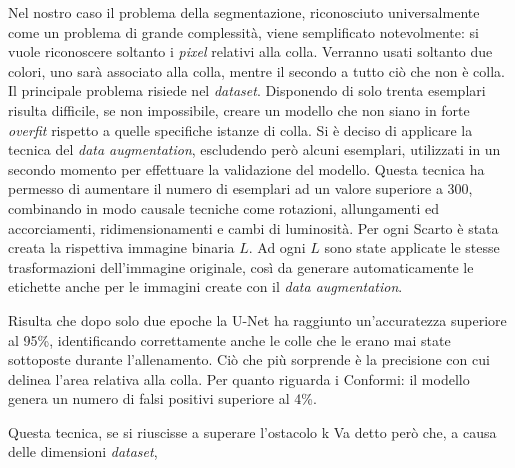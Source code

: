 Nel nostro caso il problema della segmentazione, riconosciuto universalmente come un problema di grande complessità, viene semplificato notevolmente: si vuole riconoscere soltanto i \textit{pixel} relativi alla colla.
Verranno usati soltanto due colori, uno sarà associato alla colla, mentre il secondo a tutto ciò che non è colla.
Il principale problema risiede nel \textit{dataset}.
Disponendo di solo trenta esemplari risulta difficile, se non impossibile, creare un modello che non siano in forte \textit{overfit} rispetto a quelle specifiche istanze di colla.
Si è deciso di applicare la tecnica del \textit{data augmentation}, escludendo però alcuni esemplari, utilizzati in un secondo momento per effettuare la validazione del modello.
Questa tecnica ha permesso di aumentare il numero di esemplari ad un valore superiore a 300, combinando in modo causale tecniche come rotazioni, allungamenti ed accorciamenti, ridimensionamenti e cambi di luminosità.
Per ogni Scarto è stata creata la rispettiva immagine binaria $L$.
Ad ogni $L$ sono state applicate le stesse trasformazioni dell'immagine originale, così da generare automaticamente le etichette anche per le immagini create con il \textit{data augmentation}.

Risulta che dopo solo due epoche la U-Net ha raggiunto un'accuratezza superiore al 95\%, identificando correttamente anche le colle che le erano mai state sottoposte durante l'allenamento.
Ciò che più sorprende è la precisione con cui delinea l'area relativa alla colla.
Per quanto riguarda i Conformi: il modello genera un numero di falsi positivi superiore al 4\%.

Questa tecnica, se si riuscisse a superare l'ostacolo k
Va detto però che, a causa delle dimensioni \textit{dataset},


